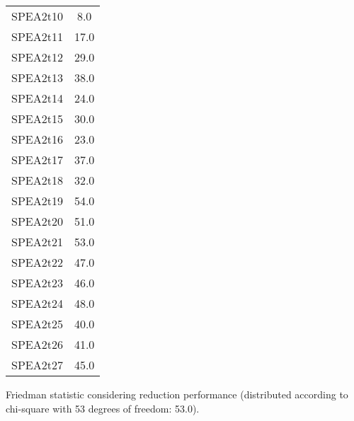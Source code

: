 \documentclass{article}
\begin{document}
\begin{table}[!htp]
\begin{tabular}{c|c}
SPEA2t10&8.0\\
SPEA2t11&17.0\\
SPEA2t12&29.0\\
SPEA2t13&38.0\\
SPEA2t14&24.0\\
SPEA2t15&30.0\\
SPEA2t16&23.0\\
SPEA2t17&37.0\\
SPEA2t18&32.0\\
SPEA2t19&54.0\\
SPEA2t20&51.0\\
SPEA2t21&53.0\\
SPEA2t22&47.0\\
SPEA2t23&46.0\\
SPEA2t24&48.0\\
SPEA2t25&40.0\\
SPEA2t26&41.0\\
SPEA2t27&45.0\\
\end{tabular}
\end{table}


Friedman statistic considering reduction performance (distributed according to chi-square with 53 degrees of freedom: 53.0).
\end{document}
